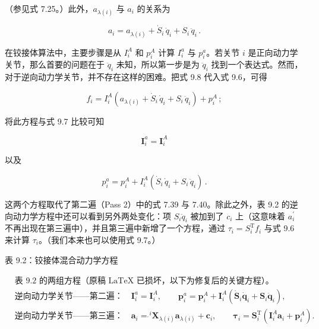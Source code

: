 \documentclass[10pt,a4paper]{book}
\theoremstyle{thmstyle} %
\theoremstyle{defstyle} %
\theoremstyle{prostyle} %
\begin{document}
（参见式 7.25。）此外，$a_{\lambda(i)}$ 与 $a_{i}$ 的关系为



$$
a _ { i } = a _ { \lambda ( i ) } + \dot { S } _ { i } \, \dot { q } _ { i } + S _ { i } \, \ddot { q } _ { i } \, .
$$



在铰接体算法中，主要步骤是从 $I_{i}^{A}$ 和 $p_{i}^{A}$ 计算 $I_{i}^{a}$ 与 $p_{i}^{a}$。若关节 $i$ 是正向动力学关节，那么首要的问题在于 $\ddot{q}_{i}$ 未知，所以第一步是为 $\ddot{q}_{i}$ 找到一个表达式。然而，对于逆向动力学关节，并不存在这样的困难。把式 9.8 代入式 9.6，可得



$$
f _ { i } = I _ { i } ^{A} ( a _ { \lambda ( i ) } + \dot { S } _ { i } \, \dot { q } _ { i } + S _ { i } \, \ddot { q } _ { i } ) + p _ { i } ^{A} \, ;
$$



将此方程与式 9.7 比较可知



$$
{ \boldsymbol { I } } _ { i } ^{a} = { \boldsymbol { I } } _ { i } ^{A}
$$



以及



$$
p _ { i } ^{a} = p _ { i } ^{A} + I _ { i } ^{A} ( \dot { S } _ { i } \, \dot { q } _ { i } + S _ { i } \, \ddot { q } _ { i } ) \, .
$$



这两个方程取代了第二遍（Pass 2）中的式 7.39 与 7.40。除此之外，表 9.2 的逆向动力学方程中还可以看到另外两处变化：项 $S_{i}\ddot{q}_{i}$ 被加到了 $c_{i}$ 上（这意味着 $a_{i}^{\prime}$ 不再出现在第三遍中），并且第三遍中新增了一个方程，通过 $\tau_{i}=S_{i}^{\mathrm{T}}f_{i}$ 与式 9.6 来计算 $\tau_{i}$。（我们本来也可以使用式 9.7。）



表 9.2：铰接体混合动力学方程



$$
\begin{aligned}&\text{表 9.2 的两组方程（原稿 LaTeX 已损坏，以下为修复后的关键方程）。}\\
&\text{逆向动力学关节——第二遍：}\quad \boldsymbol{I}_{i}^{a}=\boldsymbol{I}_{i}^{A},\qquad \boldsymbol{p}_{i}^{a}=\boldsymbol{p}_{i}^{A}+\boldsymbol{I}_{i}^{A}\left(\dot{\boldsymbol{S}}_{i}\dot{\boldsymbol{q}}_{i}+\boldsymbol{S}_{i}\ddot{\boldsymbol{q}}_{i}\right),\\
&\text{逆向动力学关节——第三遍：}\quad \boldsymbol{a}_{i}=\dot{}^{i}\boldsymbol{X}_{\lambda(i)}\boldsymbol{a}_{\lambda(i)}+\boldsymbol{c}_{i},\qquad \boldsymbol{\tau}_{i}=\boldsymbol{S}_{i}^{\mathrm{T}}\left(\boldsymbol{I}_{i}^{A}\boldsymbol{a}_{i}+\boldsymbol{p}_{i}^{A}\right).\end{aligned}
$$
\end{document}
